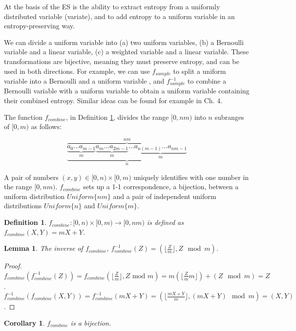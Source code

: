 \documentclass[12pt]{article}
\newtheorem{lemma}{Lemma}
\newtheorem{corollary}{Corollary}
\newtheorem{definition}{Definition}
\begin{document}
At the basis of the ES is the ability to extract entropy from a uniformly distributed variable (variate), and to add entropy to a uniform variable in an entropy-preserving way.

We can divide a uniform variable into (a) two uniform variables, (b) a Bernoulli variable and a linear variable, (c) a weighted variable and a linear variable. These transformations are bijective, meaning they must preserve entropy, and can be used in both directions.  For example, we can use $f_{sample}$ to split a uniform variable into a Bernoulli and a uniform variable , and $f^{-1}_{sample}$ to combine a Bernoulli variable with a uniform variable to obtain a uniform variable containing their combined entropy. Similar ideas can be found for example in \cite{gentle2003random} Ch. 4. 

The function $f_{combine}$, in Definition \ref{def:combine}, divides the range $[0,nm)$ into $n$ subranges of $[0,m)$ as follows:

\[
\overbrace{
    \underbrace{
        \underbrace{a_0 ... a_{m-1}}_{m}
        \underbrace{a_m ... a_{2m-1}}_{m}
        ...
        \underbrace{a_{n(m-1)}...a_{nm-1}}_{m} 
        }_{n}}
        ^{nm}
\]

A pair of numbers $(x,y) \in [0,n)\times[0,m)$ uniquely identifies with one number in the range $[0,nm)$. $f_{combine}$ sets up a 1-1 correspondence, a bijection, between a uniform distribution $Uniform\{nm\}$ and a pair of independent uniform distributions $Uniform\{n\}$ and $Uniform\{m\}$.

\begin{definition}
    $f_{combine}: [0,n)\times [0,m) \rightarrow [0,nm)$ is defined as $f_{combine}(X,Y) = mX+Y$.
    \label{def:combine}
\end{definition}

\begin{lemma}
    The inverse of $f_{combine}$, $f^{-1}_{combine}(Z) = (\lfloor \frac{Z}{m} \rfloor, Z \mod m)$.
\end{lemma}

\begin{proof}
    $f_{combine}(f^{-1}_{combine}(Z)) = f_{combine}(\lfloor \frac{Z}{m}\rfloor, Z \text{ mod } m) = m(\lfloor \frac{Z}{m}m \rfloor) + (Z \mod m) = Z$. $f^{-1}_{combine}(f_{combine}(X,Y)) = f^{-1}_{combine}(mX+Y) = (\lfloor\frac{mX+Y}{m}\rfloor, (mX+Y)\mod m) = (X,Y)$.
\end{proof}

\begin{corollary}
    $f_{combine}$ is a bijection.
\end{corollary}
\end{document}
